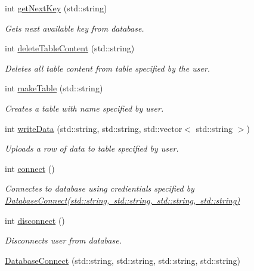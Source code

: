 \begin{DoxyCompactItemize}
\item 
int \mbox{\hyperlink{classDatabaseConnect_a09195941dbccc3a9ae41edc9440f0513}{get\+Next\+Key}} (std\+::string)
\begin{DoxyCompactList}\small\item\em Gets next available key from database. \end{DoxyCompactList}\item 
int \mbox{\hyperlink{classDatabaseConnect_a252260a2134ff437ce2b84480a5632a0}{delete\+Table\+Content}} (std\+::string)
\begin{DoxyCompactList}\small\item\em Deletes all table content from table specified by the user. \end{DoxyCompactList}\item 
int \mbox{\hyperlink{classDatabaseConnect_a255912a26d94bddf7b2400df4bc3fa18}{make\+Table}} (std\+::string)
\begin{DoxyCompactList}\small\item\em Creates a table with name specified by user. \end{DoxyCompactList}\item 
int \mbox{\hyperlink{classDatabaseConnect_a0bcf3c738cc1cdd85cec0498b876ad5a}{write\+Data}} (std\+::string, std\+::string, std\+::vector$<$ std\+::string $>$)
\begin{DoxyCompactList}\small\item\em Uploads a row of data to table specified by user. \end{DoxyCompactList}\item 
int \mbox{\hyperlink{classDatabaseConnect_a9e0c28f4d98a60273eecaac77a596878}{connect}} ()
\begin{DoxyCompactList}\small\item\em Connectes to database using credientials specified by \mbox{\hyperlink{classDatabaseConnect_ad4273735005641691826765240a1dfb8}{Database\+Connect(std\+::string, std\+::string, std\+::string, std\+::string)}} \end{DoxyCompactList}\item 
int \mbox{\hyperlink{classDatabaseConnect_a1a276c7ee1c41f1ba38ff6e31f804f83}{disconnect}} ()
\begin{DoxyCompactList}\small\item\em Disconnects user from database. \end{DoxyCompactList}\item 
\mbox{\hyperlink{classDatabaseConnect_ad4273735005641691826765240a1dfb8}{Database\+Connect}} (std\+::string, std\+::string, std\+::string, std\+::string)

\end{DoxyCompactItemize}
